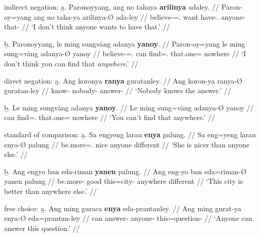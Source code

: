 \a indirect negation:\vspace{.5em} %
	\beginsubsub
	\b{a.} \begingl
		\gla Paronoyyang, ang no tahaya \textbf{arilinya} adaley. //
		\glb Paron-oy=yang ang no taha-ya arilinya-Ø ada-ley //
		\glc believe-\Neg{}=\Fsg{}.\Aarg{} \AgtT{} want 
			have-\Tsg{}.\M{} anyone-\Top{} that-\PargI{} //
		\glft `I don't think anyone wants to have that.' //
		\endgl\vspace{.5em}
	
	\b{b.} \begingl
		\gla Paronoyyang, le ming sungvāng adanya \textbf{yanoy}. //
		\glb Paron-oy=yang le ming sung=vāng adanya-Ø yanoy //
		\glc believe-\Neg{}=\Fsg{}.\Aarg{} \PatTI{} can 
			find=\Ssg{}.\Aarg{} that.one=\Top{} nowhere //
		\glft `I don't think you can find that \emph{anywhere}.' //
		\endgl
	\endsubsub
	
\a direct negation:\vspace{.5em} %
	\beginsubsub
	\b{a.} \begingl
		\gla Ang koronya \textbf{ranya} guratanley. //
		\glb Ang koron-ya ranya-Ø guratan-ley //
		\glc \AgtT{} know-\TsgM{} nobody-\Top{} answer-\PargI{} //
		\glft `Nobody knows the answer.' //
		\endgl\vspace{.5em}
		
	\b{b.} \begingl
		\gla Le ming sungvāng adanya \textbf{yanoy}. //
		\glb Le ming sung=vāng adanya-Ø yanoy //
		\glc \PatTI{} can find=\Ssg{}.\Aarg{} that.one=\Top{} nowhere //
		\glft `You can't find that anywhere.' //
		\endgl
	\endsubsub
	
\a standard of comparison:\vspace{.5em} %
	\beginsubsub
	\b{a.} \begingl
		\gla Sa engyeng larau \textbf{enya} palung. //
		\glb Sa eng=yeng larau enya-Ø palung //
		\glc \PatT{} be.more=\TsgF{}.\Aarg{} nice anyone different //
		\glft `She is nicer than anyone else.' //
		\endgl\vspace{.5em}
		
	\b{b.} \begingl
		\gla Ang engyo ban eda-riman \textbf{yanen} palung. //
		\glb Ang eng-yo ban eda=riman-Ø yanen palung //
		\glc \AgtT{} be.more-\TsgN{} good this=city-\Top{} anywhere 
			different //
		\glft `This city is better than anywhere else.' //
		\endgl
	\endsubsub

\a free choice:\vspace{.5em} %
	\beginsubsub
	\b{a.} \begingl
		\gla Ang ming guraca \textbf{enya} eda-prantanley. //
		\glb Ang ming gurat-ya enya-Ø eda=prantan-ley //
		\glc \AgtT{} can answer-\TsgM{} anyone-\Top{} 
this=question-\PargI{} //
		\glft `Anyone can answer this question.' //
		\endgl\vspace{.5em}
		
